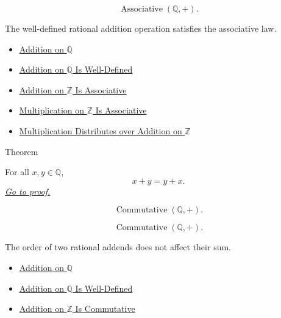 \begin{remark*}
\[
\operatorname{Associative}(\mathbb{Q},+).
\]
\end{remark*}

\begin{remark*}[Interpretation]
The well-defined rational addition operation satisfies the associative law.
\end{remark*}

\begin{dependencies}
\begin{itemize}
  \item \hyperref[def:addition-on-q-classes]{Addition on $\mathbb{Q}$}
  \item \hyperref[thm:addition-on-q-well-defined]{Addition on $\mathbb{Q}$ Is Well-Defined}
  \item \hyperref[thm:addition-on-z-associative]{Addition on $\mathbb{Z}$ Is Associative}
  \item \hyperref[thm:multiplication-on-z-associative]{Multiplication on $\mathbb{Z}$ Is Associative}
  \item \hyperref[thm:multiplication-distributes-over-addition-on-z]{Multiplication Distributes over Addition on $\mathbb{Z}$}
\end{itemize}
\end{dependencies}

\begin{theorembox}{Theorem}
\begin{theorem}
\label{thm:addition-on-q-commutative}
For all $x,y\in\mathbb{Q}$,
\[
x+y=y+x.
\]
\hyperref[prf:addition-on-q-commutative]{\textit{Go to proof.}}
\end{theorem}
\end{theorembox}

\begin{remark*}
\[
\operatorname{Commutative}(\mathbb{Q},+).
\]
\end{remark*}

\begin{remark*}
\[
\operatorname{Commutative}(\mathbb{Q},+).
\]
\end{remark*}

\begin{remark*}[Interpretation]
The order of two rational addends does not affect their sum.
\end{remark*}

\begin{dependencies}
\begin{itemize}
  \item \hyperref[def:addition-on-q-classes]{Addition on $\mathbb{Q}$}
  \item \hyperref[thm:addition-on-q-well-defined]{Addition on $\mathbb{Q}$ Is Well-Defined}
  \item \hyperref[thm:addition-on-z-commutative]{Addition on $\mathbb{Z}$ Is Commutative}
\end{itemize}
\end{dependencies}

